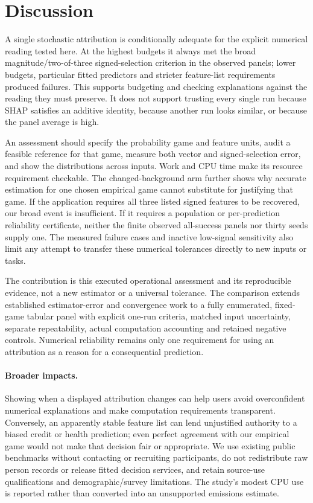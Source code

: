 \section{Discussion}
\label{sec:discussion}

A single stochastic attribution is conditionally adequate for the explicit numerical reading tested here. At the highest budgets it always met the broad magnitude/two-of-three signed-selection criterion in the observed panels; lower budgets, particular fitted predictors and stricter feature-list requirements produced failures. This supports budgeting and checking explanations against the reading they must preserve. It does not support trusting every single run because SHAP satisfies an additive identity, because another run looks similar, or because the panel average is high.

An assessment should specify the probability game and feature units, audit a feasible reference for that game, measure both vector and signed-selection error, and show the distributions across inputs. Work and CPU time make its resource requirement checkable. The changed-background arm further shows why accurate estimation for one chosen empirical game cannot substitute for justifying that game. If the application requires all three listed signed features to be recovered, our broad event is insufficient. If it requires a population or per-prediction reliability certificate, neither the finite observed all-success panels nor thirty seeds supply one. The measured failure cases and inactive low-signal sensitivity also limit any attempt to transfer these numerical tolerances directly to new inputs or tasks.

The contribution is this executed operational assessment and its reproducible evidence, not a new estimator or a universal tolerance. The comparison extends established estimator-error and convergence work to a fully enumerated, fixed-game tabular panel with explicit one-run criteria, matched input uncertainty, separate repeatability, actual computation accounting and retained negative controls. Numerical reliability remains only one requirement for using an attribution as a reason for a consequential prediction.

\paragraph{Broader impacts.}
Showing when a displayed attribution changes can help users avoid overconfident numerical explanations and make computation requirements transparent. Conversely, an apparently stable feature list can lend unjustified authority to a biased credit or health prediction; even perfect agreement with our empirical game would not make that decision fair or appropriate. We use existing public benchmarks without contacting or recruiting participants, do not redistribute raw person records or release fitted decision services, and retain source-use qualifications and demographic/survey limitations. The study's modest CPU use is reported rather than converted into an unsupported emissions estimate.

